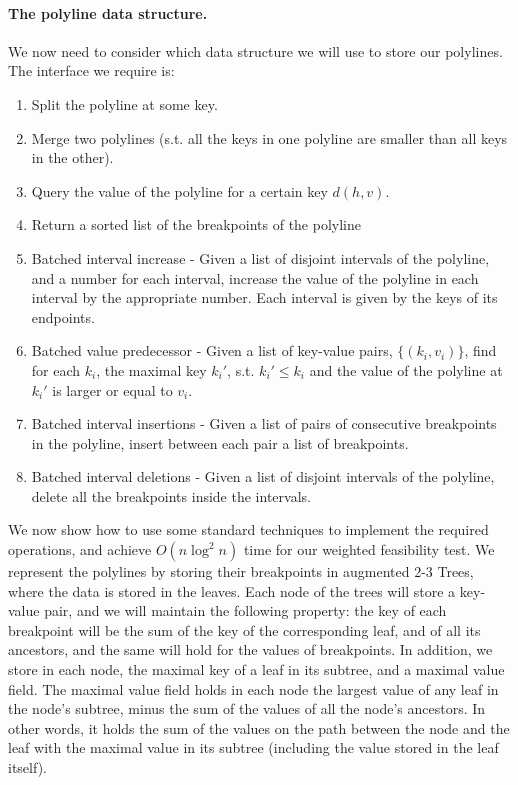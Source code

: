 \documentclass[11pt,a4paper]{article}
\theoremstyle{definition}
\theoremstyle{remark}
\begin{document}
\paragraph{The polyline data structure.} We now need to consider which data structure we will use to store our polylines. The interface we require is:
\begin{enumerate}
\item Split the polyline at some key.
\item Merge two polylines (s.t. all the keys in one polyline are smaller than all keys in the other).
\item Query the value of the polyline for a certain key $d(h,v)$.
\item Return a sorted list of the breakpoints of the polyline
\item Batched interval increase - Given a list of disjoint intervals of the polyline, and a number for each interval, increase the value of the polyline in each interval by the appropriate number. Each interval is given by the keys of its endpoints.
\item Batched value predecessor - Given a list of key-value pairs, $\{(k_i,v_i)\}$, find for each $k_i$, the maximal key $k_{i}'$, s.t. $k_{i}' \leq k_i$ and the value of the polyline at $k_{i}'$ is larger or equal to $v_i$.
\item Batched interval insertions - Given a list of pairs of consecutive breakpoints in the polyline, insert between each pair a list of breakpoints.
\item Batched interval deletions - Given a list of disjoint intervals of the polyline, delete all the breakpoints inside the intervals.
\end{enumerate}

We now show how to use some standard techniques to implement the required operations, and achieve $O(n \log ^2 n)$ time for our weighted feasibility test. %
We represent the polylines by storing their breakpoints in augmented 2-3 Trees, where the data is stored in the leaves. Each node of the trees will store a key-value pair, and we will maintain the following property: the key of each breakpoint will be the sum of the key of the corresponding leaf, and of all its ancestors, and the same will hold for the values of breakpoints. In addition, we store in each node, the maximal key of a leaf in its subtree, and a maximal value field. The maximal value field holds in each node the largest value of any leaf in the node's subtree, minus the sum of the values of all the node's ancestors. In other words, it holds the sum of the values on the path between the node and the leaf with the maximal value in its subtree (including the value stored in the leaf itself).
\end{document}
